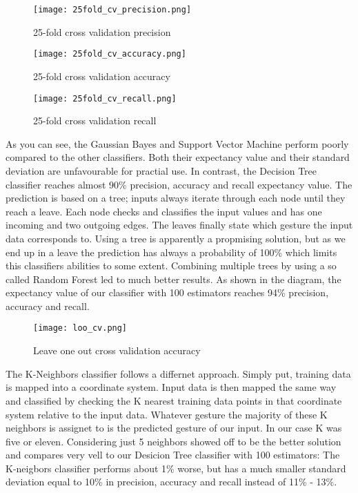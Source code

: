 \begin{figure}[!htb]
  \texttt{[image: 25fold\_cv\_precision.png]}
  \caption{25-fold cross validation precision}\label{fig:precision}
\endminipage\hfill
{}
  \texttt{[image: 25fold\_cv\_accuracy.png]}
  \caption{25-fold cross validation accuracy}\label{fig:accuracy}
\endminipage\hfill
{}%
  \texttt{[image: 25fold\_cv\_recall.png]}
  \caption{25-fold cross validation recall}\label{fig:recall}
\endminipage
\end{figure}

As you can see, the Gaussian Bayes and Support Vector Machine perform poorly compared to the other classifiers. Both their expectancy value and their standard deviation are unfavourable for practial use. In contrast, the Decision Tree classifier reaches almost 90\% precision, accuracy and recall expectancy value. The prediction is based on a tree; inputs always iterate through each node until they reach a leave. Each node checks and classifies the input values and has one incoming and two outgoing edges. The leaves finally state which gesture the input data corresponds to. Using a tree is apparently a propmising solution, but as we end up in a leave the prediction has always a probability of 100\% which limits this classifiers abilities to some extent. Combining multiple trees by using a so called Random Forest led to much better results. As shown in the diagram, the expectancy value of our classifier with 100 estimators reaches 94\% precision, accuracy and recall. 

\begin{wrapfigure}{R}{0.4\textwidth}
\centering
\texttt{[image: loo\_cv.png]}
\caption{Leave one out cross validation accuracy}\label{fig:loo}
\end{wrapfigure}

The K-Neighbors classifier follows a differnet approach. Simply put, training data is mapped into a coordinate system. Input data is then mapped the same way and classified by checking the K nearest training data points in that coordinate system relative to the input data. Whatever gesture the majority of these K neighbors is assignet to is the predicted gesture of our input. In our case K was five or eleven. Considering just 5 neighbors showed off to be the better solution and compares very vell to our Desicion Tree classifier with 100 estimators: The K-neigbors classifier performs about 1\% worse, but has a much smaller standard deviation equal to 10\% in precision, accuracy and recall instead of 11\% - 13\%.

